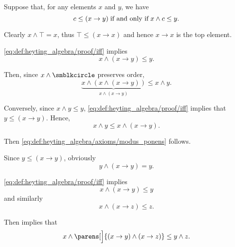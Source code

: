 \begin{defproof}
   Suppose that, for any elements \( x \) and \( y \), we have
  \begin{equation}\label{eq:def:heyting_algebra/proof/iff}
    c \leq (x \rightarrow y) \T{if and only if} x \wedge c \leq y.
  \end{equation}

   Clearly \( x \wedge \top = x \), thus \( \top \leq (x \rightarrow x) \) and hence \( x \rightarrow x \) is the top element.

   \eqref{eq:def:heyting_algebra/proof/iff} implies
  \begin{equation*}
    x \wedge (x \rightarrow y) \leq y.
  \end{equation*}

  Then, since \( x \wedge \anon \) preserves order,
  \begin{equation*}
    \underbrace{x \wedge (x \wedge (x \rightarrow y))}_{x \wedge (x \rightarrow y)} \leq x \wedge y.
  \end{equation*}

  Conversely, since \( x \wedge y \leq y \), \eqref{eq:def:heyting_algebra/proof/iff} implies that \( y \leq (x \rightarrow y) \). Hence,
  \begin{equation*}
    x \wedge y \leq x \wedge (x \rightarrow y).
  \end{equation*}

  Then \eqref{eq:def:heyting_algebra/axioms/modus_ponens} follows.

   Since \( y \leq (x \rightarrow y) \), obviously
  \begin{equation*}
    y \wedge (x \rightarrow y) = y.
  \end{equation*}

   \eqref{eq:def:heyting_algebra/proof/iff} implies
  \begin{equation*}
    x \wedge (x \rightarrow y) \leq y
  \end{equation*}
  and similarly
  \begin{equation*}
    x \wedge (x \rightarrow z) \leq z.
  \end{equation*}

  Then  implies that
  \begin{equation*}
    x \wedge \parens[\Big]{ (x \rightarrow y) \wedge (x \rightarrow z) } \leq y \wedge z.
  \end{equation*}


\end{defproof}
